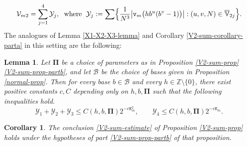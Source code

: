 \documentclass[12pt, twoside]{article}
\newtheorem{lemma}[theorem]{Lemma}
\newtheorem{corollary}[theorem]{Corollary}
\theoremstyle{definition}
\numberwithin{equation}{section}
\begin{document}
\begin{equation} \label{Yj-def}
\mathcal V_{m2} = \sum_{j=1}^{4} \mathcal Y_j, \; \text{ where } \; \mathcal Y_j := \sum \Bigl\{\frac{1}{N^3}\bigl| \mathtt v_m \bigl(hb^u(b^v-1) \bigr) \bigr| : (u, v, N) \in \overline{\mathbb V}_{2j}\Bigr\}.  
\end{equation}
The analogues of Lemma \ref{X1-X2-X3-lemma} and Corollary \ref{V2-sum-corollary-parta} in this setting are the following: 
\begin{lemma} \label{Yj-lemma}
Let $\pmb{\Pi}$ be a choice of parameters {as in Proposition \ref{V2-sum-prop} \eqref{V2-sum-prop-partb}}, and let $\mathscr{B}$ be the choice of bases given in Proposition \ref{normal-prop}. Then for every base $b \in \mathscr{B}$ and every $h \in \mathbb Z \setminus \{0\}$,  there exist positive constants $c, C$ depending only on $h, b, \pmb{\Pi}$ such that the following inequalities hold.
\begin{equation} \label{Y1+Y2+Y3+Y4}
\mathcal Y_1 + \mathcal Y_2 + \mathcal Y_3  \leq C(h,b, \pmb{\Pi}) 2^{-c \mathtt K_m^2}, \qquad \mathcal Y_4 \leq C(h,b, \pmb{\Pi}) 2^{-c\mathtt K_m}.
\end{equation} 
 \end{lemma} 
\begin{corollary} \label{V2-sum-corollary-partb}
The conclusion \eqref{V2-sum-estimate} of Proposition \ref{V2-sum-prop} holds under the hypotheses of part \eqref{V2-sum-prop-partb} of that proposition. 
\end{corollary} 
\end{document}

